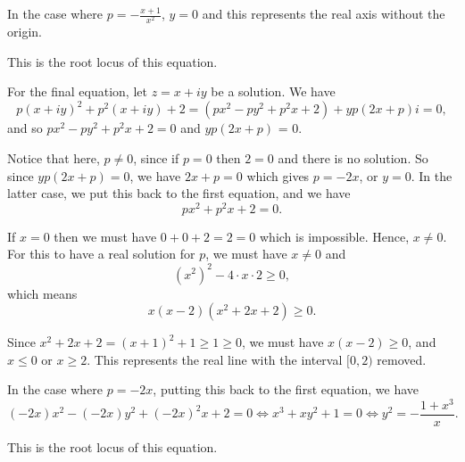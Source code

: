 In the case where \(p = -\frac{x + 1}{x^2}\), \(y = 0\) and this represents the real axis without the origin.

This is the root locus of this equation.

\begin{center}
    
\end{center}

For the final equation, let \(z = x + iy\) be a solution. We have
\[
    p(x + iy)^2 + p^2 (x + iy) + 2 = (px^2 - py^2 + p^2x + 2) + yp(2x + p)i = 0,
\]
and so \(px^2 - py^2 + p^2x + 2 = 0\) and \(yp(2x + p)\) = 0.

Notice that here, \(p \neq 0\), since if \(p = 0\) then \(2 = 0\) and there is no solution. So since \(yp (2x + p) = 0\), we have \(2x + p = 0\) which gives \(p = -2x\), or \(y = 0\). In the latter case, we put this back to the first equation, and we have
\[
    p x^2 + p^2 x + 2 = 0.
\]

If \(x = 0\) then we must have \(0 + 0 + 2 = 2 = 0\) which is impossible. Hence, \(x \neq 0\). For this to have a real solution for \(p\), we must have \(x \neq 0\) and
\[
    (x^2)^2 - 4 \cdot x \cdot 2 \geq 0,
\]
which means
\[
    x (x - 2) (x^2 + 2x + 2) \geq 0.
\]

Since \(x^2 + 2x + 2 = (x + 1)^2 + 1 \geq 1 \geq 0\), we must have \(x (x - 2) \geq 0\), and \(x \leq 0\) or \(x \geq 2\). This represents the real line with the interval \([0, 2)\) removed.

In the case where \(p = -2x\), putting this back to the first equation, we have
\[
    (-2x) x^2 - (-2x)y^2 + (-2x)^2 x + 2 = 0 \iff x^3 + xy^2 + 1 = 0 \iff y^2 = -\frac{1 + x^3}{x}.
\]

This is the root locus of this equation.

\begin{center}
    
\end{center}